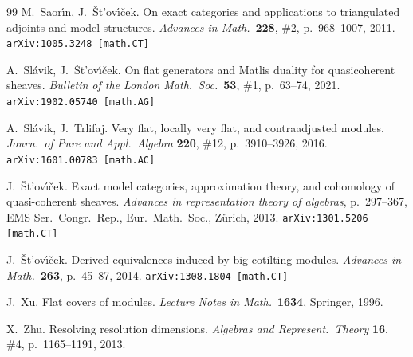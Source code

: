 \documentclass[12pt,a4paper]{amsart}
\newcommand{\+}{\nobreakdash-}
\renewcommand{\:}{\colon}
\theoremstyle{plain}
\theoremstyle{definition}
\begin{document}
\begin{thebibliography}{99}
 M.~Saor\'\i n, J.~\v St\!'ov\'\i\v cek.
   On exact categories and applications to triangulated adjoints
and model structures.
\textit{Advances in Math.}\ \textbf{228}, \#2, p.~968--1007, 2011.
\texttt{arXiv:1005.3248 [math.CT]}

 A.~Sl\'avik, J.~\v St\!'ov\'\i\v cek.
   On flat generators and Matlis duality for quasicoherent sheaves.
\textit{Bulletin of the London Math.\ Soc.}\ \textbf{53}, \#1,
p.~63--74, 2021.  \texttt{arXiv:1902.05740 [math.AG]}

 A.~Sl\'avik, J.~Trlifaj.
   Very flat, locally very flat, and contraadjusted modules.
\textit{Journ.\ of Pure and Appl.\ Algebra} \textbf{220}, \#12,
p.~3910--3926, 2016.  \texttt{arXiv:1601.00783 [math.AC]}

 J.~\v St\!'ov\'\i\v cek.
   Exact model categories, approximation theory, and cohomology of
quasi-coherent sheaves.
\textit{Advances in representation theory of algebras}, p.~297--367,
EMS Ser.\ Congr.\ Rep., Eur.\ Math.\ Soc., Z\" urich, 2013.
\texttt{arXiv:1301.5206 [math.CT]}

 J.~\v St\!'ov\'\i\v cek.
   Derived equivalences induced by big cotilting modules. 
\textit{Advances in Math.}\ \textbf{263}, p.~45--87, 2014.
\texttt{arXiv:1308.1804 [math.CT]}

 J.~Xu.
   Flat covers of modules.
\textit{Lecture Notes in Math.}\ \textbf{1634}, Springer, 1996.

 X.~Zhu.
   Resolving resolution dimensions.
\textit{Algebras and Represent.\ Theory} \textbf{16}, \#4,
p.~1165--1191, 2013.

\end{thebibliography}
\end{document}
